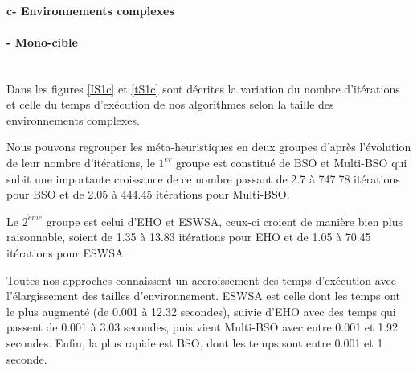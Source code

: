 	\paragraph{c- Environnements complexes}
	\textbf{}
	\noindent
	\paragraph{- Mono-cible}
	\textbf{ }\\
	Dans les figures \ref{IS1c} et \ref{tS1c} sont décrites la variation du nombre d'itérations et celle du temps d'exécution de nos algorithmes selon la taille des environnements complexes.\\
	\vspace{-0.2cm}
	
	Nous pouvons regrouper les méta-heuristiques en deux groupes d'après l'évolution de leur nombre d'itérations, le $1^{er}$ groupe est constitué de BSO et Multi-BSO qui subit une importante croissance de ce nombre passant de 2.7 à 747.78 itérations pour BSO et de 2.05 à 444.45 itérations pour Multi-BSO.
	
	Le $2^{\grave{e}me}$ groupe est celui d'EHO et ESWSA, ceux-ci croient de manière bien plus raisonnable, soient de 1.35 à 13.83 itérations pour EHO et de 1.05 à 70.45 itérations pour ESWSA.\\
	\vspace{-0.2cm}
	
	Toutes nos approches connaissent un 
	accroissement des temps d'exécution avec l'élargissement des tailles d'environnement. ESWSA est celle dont les temps ont le plus augmenté (de 0.001 à 12.32 secondes), suivie d'EHO avec des temps qui passent de 0.001 à 3.03 secondes, puis vient Multi-BSO avec entre 0.001 et 1.92 secondes. Enfin, la plus rapide est BSO, dont les temps sont entre 0.001 et 1 seconde.
	
	
	
	\noindent
	\hspace{-0.5cm}
	\begin{minipage}[t]{0.55\textwidth}
		\captionsetup{width=0.8\linewidth}
		\centering{}
		\label{IS1c}
	\end{minipage}\hfill
	\begin{minipage}[t]{0.55\textwidth}
		\captionsetup{width=0.8\linewidth}
		\centering{}
		\label{tS1c}
	\end{minipage}\hfill
	
